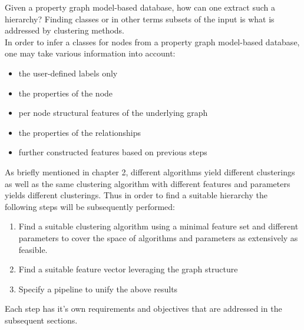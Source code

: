 Given a property graph model-based database, how can one extract such a hierarchy?
Finding classes or in other terms subsets of the input is what is addressed by clustering methods. \\
In order to infer a classes for nodes from a property graph model-based database, one may take various information into account: 
\begin{itemize}
    \item the user-defined labels only
    \item the properties of the node
    \item per node structural features of the underlying graph
    \item the properties of the relationships
    \item further constructed features based on previous steps
\end{itemize}
As briefly mentioned in chapter 2, different algorithms yield different clusterings as well as the same clustering algorithm with different features and parameters yields different clusterings. Thus in order to find a suitable hierarchy the following steps will be subsequently performed:
\begin{enumerate}
    \item Find a suitable clustering algorithm using a minimal feature set and different parameters to cover the space of algorithms and parameters as extensively as feasible.
    \item Find a suitable feature vector leveraging the graph structure
    \item Specify a pipeline to unify the above results
\end{enumerate}
Each step has it's own requirements and objectives that are addressed in the subsequent sections. \\


